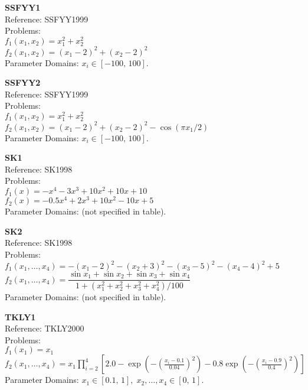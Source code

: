 \documentclass[12pt,a4paper]{article}
\begin{document}
\medskip

\textbf{SSFYY1}\\
Reference: SSFYY1999\\
Problems:\\
$f_1(x_1,x_2) = x_1^2 + x_2^2$\\
$f_2(x_1,x_2) = (x_1 - 2)^2 + (x_2 - 2)^2$\\
Parameter Domains: $x_i \in [-100,\,100]$.

\medskip

\textbf{SSFYY2}\\
Reference: SSFYY1999\\
Problems:\\
$f_1(x_1,x_2) = x_1^2 + x_2^2$\\
$f_2(x_1,x_2) = (x_1 - 2)^2 + (x_2 - 2)^2 - \cos(\pi x_1/2)$\\
Parameter Domains: $x_i \in [-100,\,100]$.

\medskip

\textbf{SK1}\\
Reference: SK1998\\
Problems:\\
 $f_1(x) = -x^4 - 3x^3 + 10x^2 + 10x + 10$\\
 $f_2(x) = -0.5x^4 + 2x^3 + 10x^2 - 10x + 5$\\
Parameter Domains: (not specified in table).

\medskip

\textbf{SK2}\\
Reference: SK1998\\
Problems:\\
 $f_1(x_1,\dots,x_4) = -(x_1-2)^2 - (x_2+3)^2 - (x_3-5)^2 - (x_4-4)^2 + 5$\\
 $f_2(x_1,\dots,x_4) = \dfrac{\sin x_1 + \sin x_2 + \sin x_3 + \sin x_4}{1 + (x_1^2+x_2^2+x_3^2+x_4^2)/100}$\\
Parameter Domains: (not specified in table).

\medskip

\textbf{TKLY1}\\
Reference: TKLY2000\\
Problems:\\
$f_1(x_1) = x_1$\\
$f_2(x_1,\dots,x_4) = x_1 \prod_{i=2}^{4}\!\left[2.0 - \exp\!\left(-\left(\frac{x_i-0.1}{0.04}\right)^2\right) - 0.8\exp\!\left(-\left(\frac{x_i-0.9}{0.4}\right)^2\right)\right]$\\
Parameter Domains: $x_1 \in [0.1,\,1],\; x_2,\dots,x_4 \in [0,\,1]$.
\end{document}
